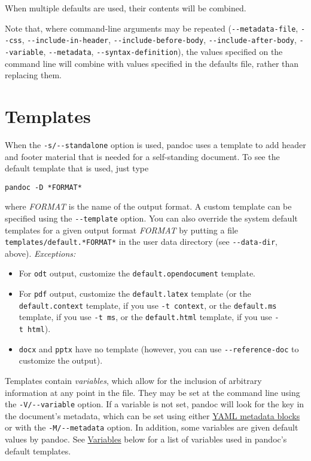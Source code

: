 \documentclass[]{article}
\providecommand{\tightlist}{%
  \setlength{\itemsep}{0pt}\setlength{\parskip}{0pt}}
\begin{document}
When multiple defaults are used, their contents will be combined.

Note that, where command-line arguments may be repeated
(\texttt{-\/-metadata-file}, \texttt{-\/-css},
\texttt{-\/-include-in-header}, \texttt{-\/-include-before-body},
\texttt{-\/-include-after-body}, \texttt{-\/-variable},
\texttt{-\/-metadata}, \texttt{-\/-syntax-definition}), the values
specified on the command line will combine with values specified in the
defaults file, rather than replacing them.

\hypertarget{templates}{%
\section{Templates}\label{templates}}

When the \texttt{-s/-\/-standalone} option is used, pandoc uses a
template to add header and footer material that is needed for a
self-standing document. To see the default template that is used, just
type

\begin{verbatim}
pandoc -D *FORMAT*
\end{verbatim}

where \emph{FORMAT} is the name of the output format. A custom template
can be specified using the \texttt{-\/-template} option. You can also
override the system default templates for a given output format
\emph{FORMAT} by putting a file \texttt{templates/default.*FORMAT*} in
the user data directory (see \texttt{-\/-data-dir}, above).
\emph{Exceptions:}

\begin{itemize}
\tightlist
\item
  For \texttt{odt} output, customize the \texttt{default.opendocument}
  template.
\item
  For \texttt{pdf} output, customize the \texttt{default.latex} template
  (or the \texttt{default.context} template, if you use
  \texttt{-t\ context}, or the \texttt{default.ms} template, if you use
  \texttt{-t\ ms}, or the \texttt{default.html} template, if you use
  \texttt{-t\ html}).
\item
  \texttt{docx} and \texttt{pptx} have no template (however, you can use
  \texttt{-\/-reference-doc} to customize the output).
\end{itemize}

Templates contain \emph{variables}, which allow for the inclusion of
arbitrary information at any point in the file. They may be set at the
command line using the \texttt{-V/-\/-variable} option. If a variable is
not set, pandoc will look for the key in the document's metadata, which
can be set using either
\protect\hyperlink{extension-yaml_metadata_block}{YAML metadata blocks}
or with the \texttt{-M/-\/-metadata} option. In addition, some variables
are given default values by pandoc. See
\protect\hyperlink{variables}{Variables} below for a list of variables
used in pandoc's default templates.
\end{document}
